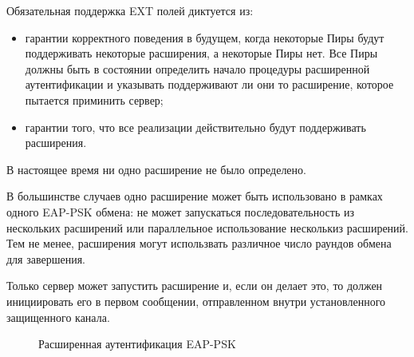 Обязательная поддержка EXT полей диктуется из:

\begin{itemize}
\item гарантии корректного поведения в будущем, когда некоторые Пиры будут поддерживать некоторые расширения, а некоторые Пиры нет. Все Пиры должны быть в состоянии определить начало процедуры расширенной аутентификации и указывать поддерживают ли они то расширение, которое пытается приминить сервер;
\item гарантии того, что все реализации действительно будут поддерживать расширения.
\end{itemize}

В настоящее время ни одно расширение не было определено.

В большинстве случаев одно расширение может быть использовано в рамках одного EAP-PSK обмена: не может запускаться последовательность из нескольких расширений или параллельное использование несколькиз расширений. Тем не менее, расширения могут использвать различное число раундов обмена для завершения.

Только сервер может запустить расширение и, если он делает это, то должен инициировать его в первом сообщении, отправленном внутри установленного защищенного канала.

\begin{figure}[h!]
\caption{Расширенная аутентификация EAP-PSK}
\label{img:extended_aut}
\end{figure}
